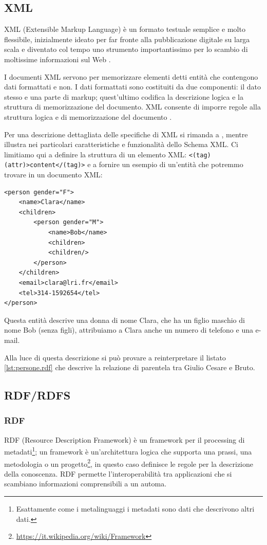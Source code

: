 \subsection{XML}
XML (Extensible Markup Language) è un formato testuale semplice e molto flessibile, inizialmente ideato per far fronte alla pubblicazione digitale su larga scala e diventato col tempo uno strumento importantissimo per lo scambio di moltissime informazioni sul Web \cite{w3cXml}.

I documenti XML servono per memorizzare elementi detti entità che contengono dati formattati e non. I dati formattati sono costituiti da due componenti: il dato stesso e una parte di markup; quest'ultimo codifica la descrizione logica e la struttura di memorizzazione del documento. XML consente di imporre regole alla struttura logica e di memorizzazione del documento \cite{world2006extensible}.

Per una descrizione dettagliata delle specifiche di XML si rimanda a \cite{world2006extensible}, mentre \cite{li2005testing} illustra nei particolari caratteristiche e funzionalità dello Schema XML. Ci limitiamo qui a definire la struttura di un elemento XML: \verb|<(tag) (attr)>content</(tag)>| e a fornire un esempio di un'entità che potremmo trovare in un documento XML:
\begin{verbatim}
<person gender="F">
	<name>Clara</name>
	<children>
		<person gender="M">
			<name>Bob</name>
			<children>
			<children/>
		</person>
	</children>
	<email>clara@lri.fr</email>
	<tel>314-1592654</tel>
</person>
\end{verbatim}
Questa entità descrive una donna di nome Clara, che ha un figlio maschio di nome Bob (senza figli), attribuiamo a Clara anche un numero di telefono e una e-mail.

Alla luce di questa descrizione si può provare a reinterpretare il listato \ref{lst:persone.rdf} che descrive la relazione di parentela tra Giulio Cesare e Bruto.
\subsection{RDF/RDFS}
\subsubsection{RDF}
RDF (Resource Description Framework) è un framework per il processing di metadati\footnote{Esattamente come i metalinguaggi i metadati sono dati che descrivono altri dati.}; un framework è un'architettura logica che supporta una prassi, una metodologia o un progetto\footnote{\url{https://it.wikipedia.org/wiki/Framework}}, in questo caso definisce le regole per la descrizione della conoscenza. RDF permette l'interoperabilità tra applicazioni che si scambiano informazioni comprensibili a un automa.


